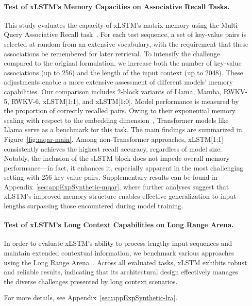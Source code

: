\paragraph{Test of xLSTM's Memory Capacities on Associative Recall Tasks.} This study evaluates the capacity of xLSTM’s matrix memory using the Multi-Query Associative Recall task~\citep{Arora:23arxiv}. For each test sequence, a set of key-value pairs is selected at random from an extensive vocabulary, with the requirement that these associations be remembered for later retrieval. To intensify the challenge compared to the original formulation, we increase both the number of key-value associations (up to 256) and the length of the input context (up to 2048). These adjustments enable a more extensive assessment of different models’ memory capabilities. Our comparison includes 2-block variants of Llama, Mamba, RWKV-5, RWKV-6, xLSTM[1:1], and xLSTM[1:0]. Model performance is measured by the proportion of correctly recalled pairs. Owing to their exponential memory scaling with respect to the embedding dimension~\citep{Ramsauer:21}, Transformer models like Llama serve as a benchmark for this task. The main findings are summarized in Figure~\ref{fig:mqar-main}. 
Among non-Transformer approaches, xLSTM[1:1] consistently achieves the highest recall accuracy, regardless of model size. Notably, the inclusion of the sLSTM block does not impede overall memory performance—in fact, it enhances it, especially apparent in the most challenging setting with 256 key-value pairs. Supplementary results can be found in Appendix~\ref{sec:appExpSynthetic-mqar}, where further analyses suggest that xLSTM’s improved memory structure enables effective generalization to input lengths surpassing those encountered during model training.

\paragraph{Test of xLSTM's Long Context Capabilities on Long Range Arena.} In order to evaluate xLSTM's ability to process lengthy input sequences and maintain extended contextual information, we benchmark various approaches using the Long Range Arena~\citep{Tay:21}. Across all evaluated tasks, xLSTM exhibits robust and reliable results, indicating that its architectural design effectively manages the diverse challenges presented by long context scenarios.

For more details, see Appendix~\ref{sec:appExpSynthetic-lra}.


